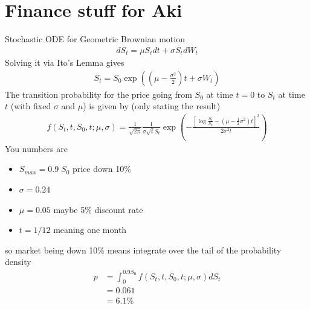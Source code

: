 \documentclass[10pt,a4paper]{book}
\theoremstyle{definition}
\begin{document}
\chapter{Finance stuff for Aki}
Stochastic ODE for Geometric Brownian motion
\begin{align}
 dS_t=\mu S_t dt+\sigma S_t dW_t
\end{align}
Solving it via Ito's Lemma gives
\begin{align}
 S_t=S_0 \exp\left(\left(\mu-\frac{\sigma^2}{2}\right)t+\sigma W_t\right)
\end{align}
The transition probability for the price going from $S_0$ at time $t=0$ to $S_t$ at time $t$ (with fixed $\sigma$ and $\mu$) is given by (only stating the result)
\begin{align}
f(S_t,t,S_0,t;\mu,\sigma)=\frac{1}{\sqrt{2\pi}}\frac{1}{\sigma\sqrt{t} S_t}\exp\left(-\frac{\left[\log\frac{S_t}{S_0}-\left(\mu-\frac{1}{2}\sigma^2\right)t\right]^2}{2\sigma^2 t}\right)
\end{align}
You numbers are
\begin{itemize}
\item $S_{max}=0.9\; S_0$ price down 10\%
\item $\sigma=0.24$
\item $\mu=0.05$ maybe 5\% discount rate
\item $t=1/12$ meaning one month
\end{itemize}
so market being down 10\% means integrate over the tail of the probability density 
\begin{align}
p&=\int_0^{0.9S_0} f(S_t,t,S_0,t;\mu,\sigma) dS_t\\
&=0.061\\
&=6.1\%
\end{align}

\newpage 
\end{document}
